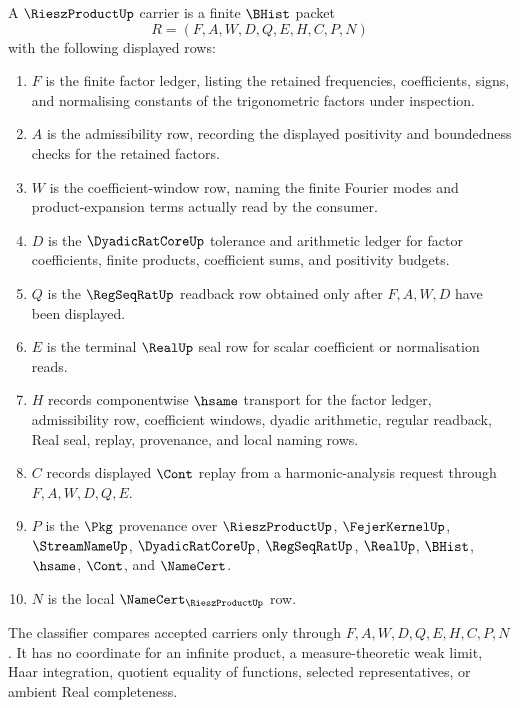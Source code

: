 \begin{definition}
\label{def:riesz-product-carrier}
A $\RieszProductUp$ carrier is a finite $\BHist$ packet
$$
R=(F,A,W,D,Q,E,H,C,P,N)
$$
with the following displayed rows:
\begin{enumerate}
\item $F$ is the finite factor ledger, listing the retained frequencies, coefficients, signs, and normalising constants of the trigonometric factors under inspection.
\item $A$ is the admissibility row, recording the displayed positivity and boundedness checks for the retained factors.
\item $W$ is the coefficient-window row, naming the finite Fourier modes and product-expansion terms actually read by the consumer.
\item $D$ is the $\DyadicRatCoreUp$ tolerance and arithmetic ledger for factor coefficients, finite products, coefficient sums, and positivity budgets.
\item $Q$ is the $\RegSeqRatUp$ readback row obtained only after $F,A,W,D$ have been displayed.
\item $E$ is the terminal $\RealUp$ seal row for scalar coefficient or normalisation reads.
\item $H$ records componentwise $\hsame$ transport for the factor ledger, admissibility row, coefficient windows, dyadic arithmetic, regular readback, Real seal, replay, provenance, and local naming rows.
\item $C$ records displayed $\Cont$ replay from a harmonic-analysis request through $F,A,W,D,Q,E$.
\item $P$ is the $\Pkg$ provenance over $\RieszProductUp$, $\FejerKernelUp$, $\StreamNameUp$, $\DyadicRatCoreUp$, $\RegSeqRatUp$, $\RealUp$, $\BHist$, $\hsame$, $\Cont$, and $\NameCert$.
\item $N$ is the local $\NameCert_{\RieszProductUp}$ row.
\end{enumerate}
The classifier compares accepted carriers only through $F,A,W,D,Q,E,H,C,P,N$. It has no coordinate for an infinite product, a measure-theoretic weak limit, Haar integration, quotient equality of functions, selected representatives, or ambient Real completeness.
\end{definition}

